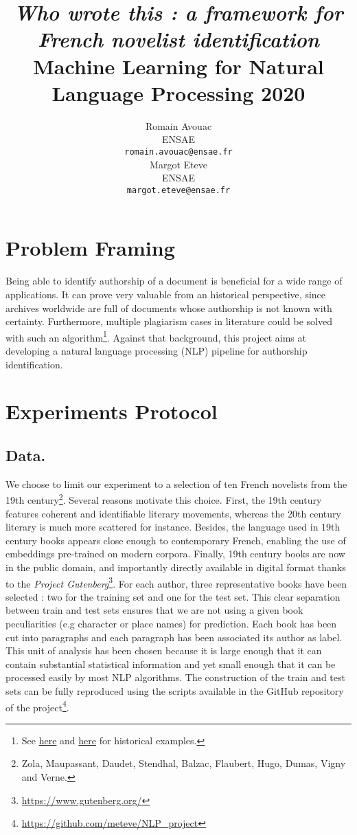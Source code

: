 \documentclass[11pt,a4paper]{article}
\title{\textit{Who wrote this : a framework for French novelist identification} \\
Machine Learning for Natural Language Processing 2020}
\author{Romain Avouac \\
  ENSAE  \\
  \texttt{romain.avouac@ensae.fr} \\\And
  Margot Eteve \\
  ENSAE \\
  \texttt{margot.eteve@ensae.fr} \\}
\date{}
\begin{document}
\maketitle

\section{Problem Framing}

Being able to identify authorship of a document is beneficial for a wide range of applications. It can prove very valuable from an historical perspective, since archives worldwide are full of documents whose authorship is not known with certainty. Furthermore, multiple plagiarism cases in literature could be solved with such an algorithm\footnote{See \href{https://en.wikipedia.org/wiki/Moli\%C3\%A8re_authorship_question}{here} and \href{https://en.wikipedia.org/wiki/Shakespeare_authorship_question}{here} for historical examples.}. Against that background, this project aims at developing a natural language processing (NLP) pipeline for authorship identification.

\section{Experiments Protocol}

\subsection{Data.} 

We choose to limit our experiment to a selection of ten French novelists from the 19th century\footnote{Zola, Maupassant, Daudet, Stendhal, Balzac, Flaubert, Hugo, Dumas, Vigny and Verne.}. Several reasons motivate this choice. First, the 19th century features coherent and identifiable literary movements, whereas the 20th century literary is much more scattered for instance. Besides, the language used in 19th century books appears close enough to contemporary French, enabling the use of embeddings pre-trained on modern corpora. Finally, 19th century books are now in the public domain, and importantly directly available in digital format thanks to the \textit{Project Gutenberg}\footnote{\url{https://www.gutenberg.org/}}. For each author, three representative books have been selected : two for the training set and one for the test set. This clear separation between train and test sets ensures that we are not using a given book peculiarities (e.g character or place names) for prediction. Each book has been cut into paragraphs and each paragraph has been associated its author as label. This unit of analysis has been chosen because it is large enough that it can contain substantial statistical information and yet small enough that it can be processed easily by most NLP algorithms. The construction of the train and test sets can be fully reproduced using the scripts available in the GitHub repository of the project\footnote{\url{https://github.com/meteve/NLP_project}}.
\end{document}
